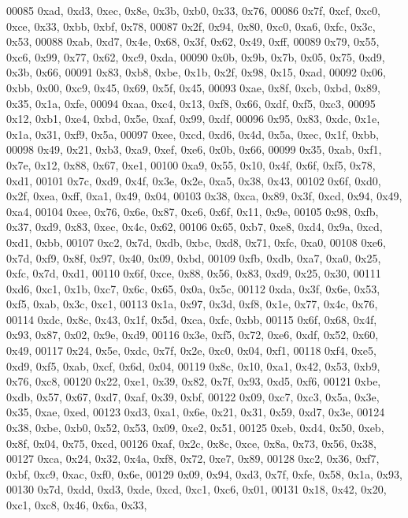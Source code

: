 \begin{DoxyCode}
00085   0xad, 0xd3, 0xec, 0x8e, 0x3b, 0xb0, 0x33, 0x76,
00086   0x7f, 0xcf, 0xc0, 0xce, 0x33, 0xbb, 0xbf, 0x78,
00087   0x2f, 0x94, 0x80, 0xc0, 0xa6, 0xfc, 0x3c, 0x53,
00088   0xab, 0xd7, 0x4e, 0x68, 0x3f, 0x62, 0x49, 0xff,
00089   0x79, 0x55, 0xc6, 0x99, 0x77, 0x62, 0xc9, 0xda,
00090   0x0b, 0x9b, 0x7b, 0x05, 0x75, 0xd9, 0x3b, 0x66,
00091   0x83, 0xb8, 0xbe, 0x1b, 0x2f, 0x98, 0x15, 0xad,
00092   0x06, 0xbb, 0x00, 0xc9, 0x45, 0x69, 0x5f, 0x45,
00093   0xae, 0x8f, 0xcb, 0xbd, 0x89, 0x35, 0x1a, 0xfe,
00094   0xaa, 0xc4, 0x13, 0xf8, 0x66, 0xdf, 0xf5, 0xc3,
00095   0x12, 0xb1, 0xe4, 0xbd, 0x5e, 0xaf, 0x99, 0xdf,
00096   0x95, 0x83, 0xdc, 0x1e, 0x1a, 0x31, 0xf9, 0x5a,
00097   0xee, 0xcd, 0xd6, 0x4d, 0x5a, 0xec, 0x1f, 0xbb,
00098   0x49, 0x21, 0xb3, 0xa9, 0xef, 0xe6, 0x0b, 0x66,
00099   0x35, 0xab, 0xf1, 0x7e, 0x12, 0x88, 0x67, 0xe1,
00100   0xa9, 0x55, 0x10, 0x4f, 0x6f, 0xf5, 0x78, 0xd1,
00101   0x7c, 0xd9, 0x4f, 0x3e, 0x2e, 0xa5, 0x38, 0x43,
00102   0x6f, 0xd0, 0x2f, 0xea, 0xff, 0xa1, 0x49, 0x04,
00103   0x38, 0xca, 0x89, 0x3f, 0xcd, 0x94, 0x49, 0xa4,
00104   0xee, 0x76, 0x6e, 0x87, 0xc6, 0x6f, 0x11, 0x9e,
00105   0x98, 0xfb, 0x37, 0xd9, 0x83, 0xec, 0x4c, 0x62,
00106   0x65, 0xb7, 0xe8, 0xd4, 0x9a, 0xcd, 0xd1, 0xbb,
00107   0xc2, 0x7d, 0xdb, 0xbc, 0xd8, 0x71, 0xfc, 0xa0,
00108   0xe6, 0x7d, 0xf9, 0x8f, 0x97, 0x40, 0x09, 0xbd,
00109   0xfb, 0xdb, 0xa7, 0xa0, 0x25, 0xfc, 0x7d, 0xd1,
00110   0x6f, 0xce, 0x88, 0x56, 0x83, 0xd9, 0x25, 0x30,
00111   0xd6, 0xc1, 0x1b, 0xc7, 0x6c, 0x65, 0x0a, 0x5c,
00112   0xda, 0x3f, 0x6e, 0x53, 0xf5, 0xab, 0x3c, 0xc1,
00113   0x1a, 0x97, 0x3d, 0xf8, 0x1e, 0x77, 0x4c, 0x76,
00114   0xdc, 0x8c, 0x43, 0x1f, 0x5d, 0xca, 0xfc, 0xbb,
00115   0x6f, 0x68, 0x4f, 0x93, 0x87, 0x02, 0x9e, 0xd9,
00116   0x3e, 0xf5, 0x72, 0xe6, 0xdf, 0x52, 0x60, 0x49,
00117   0x24, 0x5e, 0xdc, 0x7f, 0x2e, 0xc0, 0x04, 0xf1,
00118   0xf4, 0xe5, 0xd9, 0xf5, 0xab, 0xcf, 0x6d, 0x04,
00119   0x8c, 0x10, 0xa1, 0x42, 0x53, 0xb9, 0x76, 0xc8,
00120   0x22, 0xe1, 0x39, 0x82, 0x7f, 0x93, 0xd5, 0xf6,
00121   0xbe, 0xdb, 0x57, 0x67, 0xd7, 0xaf, 0x39, 0xbf,
00122   0x09, 0xc7, 0xc3, 0x5a, 0x3e, 0x35, 0xae, 0xed,
00123   0xd3, 0xa1, 0x6e, 0x21, 0x31, 0x59, 0xd7, 0x3e,
00124   0x38, 0xbe, 0xb0, 0x52, 0x53, 0x09, 0xe2, 0x51,
00125   0xeb, 0xd4, 0x50, 0xeb, 0x8f, 0x04, 0x75, 0xcd,
00126   0xaf, 0x2c, 0x8c, 0xce, 0x8a, 0x73, 0x56, 0x38,
00127   0xca, 0x24, 0x32, 0x4a, 0xf8, 0x72, 0xe7, 0x89,
00128   0xc2, 0x36, 0xf7, 0xbf, 0xc9, 0xac, 0xf0, 0x6e,
00129   0x09, 0x94, 0xd3, 0x7f, 0xfe, 0x58, 0x1a, 0x93,
00130   0x7d, 0xdd, 0xd3, 0xde, 0xcd, 0xc1, 0xc6, 0x01,
00131   0x18, 0x42, 0x20, 0xc1, 0xc8, 0x46, 0x6a, 0x33,

\end{DoxyCode}
